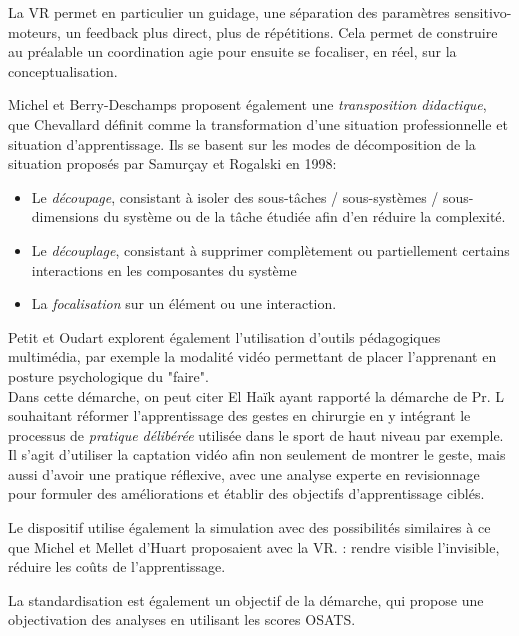 \documentclass{article}
\begin{document}
La VR permet en particulier un guidage, une séparation des paramètres 
sensitivo-moteurs, un feedback plus direct, plus de répétitions. Cela 
permet de construire au préalable un coordination agie pour ensuite se 
focaliser, en réel, sur la conceptualisation.

Michel et Berry-Deschamps \cite{michel_lapprentissage_2008} proposent 
également une \emph{transposition didactique}, que Chevallard définit 
comme la transformation d'une situation professionnelle et situation
d'apprentissage. Ils se basent sur les modes de décomposition de la
situation proposés par Samurçay et Rogalski en 1998:
\begin{itemize}
    \item Le \emph{découpage}, consistant à isoler des sous-tâches / 
    sous-systèmes / sous-dimensions du système ou de la tâche étudiée afin
    d'en réduire la complexité.
    \item Le \emph{découplage}, consistant à supprimer complètement ou
    partiellement certains interactions en les composantes du système
    \item La \emph{focalisation} sur un élément ou une interaction.
\end{itemize}

Petit et Oudart \cite{petit_apprendre_2017} explorent également 
l'utilisation d'outils pédagogiques multimédia, par exemple la modalité 
vidéo permettant de placer l'apprenant en posture psychologique du 
"faire".
\\

Dans cette démarche, on peut citer El Haïk \cite{elhaik-wagner_scorer_2024}
ayant rapporté la démarche de Pr. L souhaitant réformer l'apprentissage
des gestes en chirurgie en y intégrant le processus de \emph{pratique
délibérée} utilisée dans le sport de haut niveau par exemple. Il s'agit
d'utiliser la captation vidéo afin non seulement de montrer le geste,
mais aussi d'avoir une pratique réflexive, avec une analyse experte en
revisionnage pour formuler des améliorations et établir des objectifs
d'apprentissage ciblés.

Le dispositif utilise également la simulation avec des possibilités
similaires à ce que Michel et Mellet d'Huart proposaient avec la VR.
\cite{mellet-dhuart_faciliter_2005}: rendre visible l'invisible, réduire
les coûts de l'apprentissage.

La standardisation est également un objectif de la démarche, qui propose
une objectivation des analyses en utilisant les scores OSATS.
\end{document}
